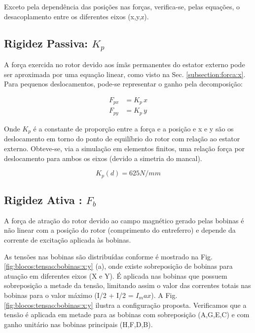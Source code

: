  Exceto pela dependência das posições nas forças, verifica-se, pelas equações, o desacoplamento entre os diferentes eixos (x,y,z). 

\subsection{Rigidez Passiva: $K_p$}

A força exercida no rotor devido aos ímãs permanentes do estator externo pode ser aproximada por uma equação linear, como visto na Sec. \ref{subsection:forca:x}. Para pequenos deslocamentos, pode-se representar o ganho pela decomposição:

\begin{align}
	F_{px} &= K_p \, x \\
	F_{py} &= K_p \, y 
\end{align}

Onde $K_p$ é a constante de proporção entre a força e a posição e x e y são os deslocamento em torno do ponto de equilíbrio do rotor com relação ao estator externo. Obteve-se, via a simulação em elementos finitos, uma relação força por deslocamento para ambos os eixos (devido a simetria do mancal). 

\begin{equation}
 K_p(d) = 625 N/mm 
\end{equation}

\subsection{Rigidez Ativa : $F_b$}

A força de atração do rotor devido ao campo magnético gerado pelas bobinas é não linear com a posição do rotor (comprimento do entreferro) e depende da corrente de excitação aplicada às bobinas.  

As tensões nas bobinas são distribuídas conforme é mostrado na Fig. \ref{fig:blocos:tensao:bobinas:x:y} (a), onde existe sobreposição de bobinas para atuação em diferentes eixos (X e Y). É aplicada nas bobinas que possuem sobreposição a metade da tensão, limitando assim o valor das correntes totais nas bobinas para o valor máximo (I/2 + I/2 = $I_max$). A Fig. \ref{fig:blocos:tensao:bobinas:x:y} ilustra a configuração proposta. Verificamos que a tensão é aplicada em metade para as bobinas com sobreposição (A,G,E,C) e com ganho unitário nas bobinas principais (H,F,D,B). 

